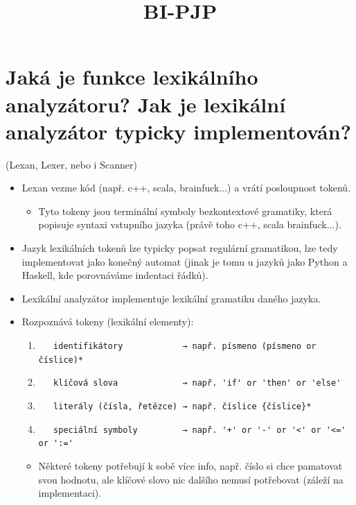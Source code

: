 \documentclass{article}
\title{\textbf{BI-PJP}}
\begin{document}
\maketitle
\newpage
\renewcommand{\contentsname}{Obsah}
\setcounter{tocdepth}{1} %
\tableofcontents
\newpage

\section{Jaká je funkce lexikálního analyzátoru? Jak je lexikální analyzátor typicky implementován?}
\textcolor{myGray}{(Lexan, Lexer, nebo i Scanner)}
\begin{itemize}
  \item Lexan vezme kód (např. c++, scala, brainfuck...) a vrátí posloupnost tokenů.
  \begin{itemize}
    \item Tyto tokeny jsou terminální symboly bezkontextové gramatiky, která popisuje syntaxi vstupního jazyka (právě toho c++, scala brainfuck...).
  \end{itemize}
  \item Jazyk lexikálních tokenů lze typicky popsat regulární gramatikou, lze tedy implementovat jako konečný automat (jinak je tomu u jazyků jako Python a Haskell, kde porovnáváme indentaci řádků). 
  \item Lexikální analyzátor implementuje lexikální gramatiku daného jazyka.
  \item Rozpoznává tokeny (lexikální elementy):
  \begin{enumerate}
    \item \verb|   identifikátory            → např. písmeno (písmeno or číslice)* |
    \item \verb|   klíčová slova             → např. 'if' or 'then' or 'else' |
    \item \verb|   literály (čísla, řetězce) → např. číslice {číslice}*|
    \item \verb|   speciální symboly         → např. '+' or '-' or '<' or '<=' or ':='|
  \end{enumerate} 
  \begin{itemize}
    \item Některé tokeny potřebují k sobě více info, např. číslo si chce pamatovat svou hodnotu, ale klíčové slovo nic dalšího nemusí potřebovat (záleží na implementaci).
  \end{itemize}


\end{itemize}
\end{document}

